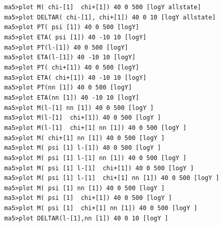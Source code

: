 \documentclass[a4paper, 10pt]{article}
\begin{document}
\texttt{ }\texttt{ }\texttt{ma5>plot M(~chi-[1] ~chi+[1]) 40 0  500 [logY allstate]\\
}
\texttt{ }\texttt{ }\texttt{ma5>plot DELTAR(~chi-[1],~chi+[1]) 40 0 10 [logY allstate]\\
}
\texttt{ }\texttt{ }\texttt{ma5>plot  PT(~psi~[1]) 40 0  500 [logY]\\
}
\texttt{ }\texttt{ }\texttt{ma5>plot ETA(~psi~[1]) 40 -10 10 [logY]\\
}
\texttt{ }\texttt{ }\texttt{ma5>plot  PT(l-[1]) 40 0  500 [logY]\\
}
\texttt{ }\texttt{ }\texttt{ma5>plot ETA(l-[1]) 40 -10 10 [logY]\\
}
\texttt{ }\texttt{ }\texttt{ma5>plot  PT(~chi+[1]) 40 0  500 [logY]\\
}
\texttt{ }\texttt{ }\texttt{ma5>plot ETA(~chi+[1]) 40 -10 10 [logY]\\
}
\texttt{ }\texttt{ }\texttt{ma5>plot  PT(nn~[1]) 40 0  500 [logY]\\
}
\texttt{ }\texttt{ }\texttt{ma5>plot ETA(nn~[1]) 40 -10 10 [logY]\\
}
\texttt{ }\texttt{ }\texttt{ma5>plot M(l-[1] nn~[1]) 40 0  500 [logY ]\\
}
\texttt{ }\texttt{ }\texttt{ma5>plot M(l-[1] ~chi+[1]) 40 0  500 [logY ]\\
}
\texttt{ }\texttt{ }\texttt{ma5>plot M(l-[1] ~chi+[1] nn~[1]) 40 0  500 [logY ]\\
}
\texttt{ }\texttt{ }\texttt{ma5>plot M(~chi+[1] nn~[1]) 40 0  500 [logY ]\\
}
\texttt{ }\texttt{ }\texttt{ma5>plot M(~psi~[1] l-[1]) 40 0  500 [logY ]\\
}
\texttt{ }\texttt{ }\texttt{ma5>plot M(~psi~[1] l-[1] nn~[1]) 40 0  500 [logY ]\\
}
\texttt{ }\texttt{ }\texttt{ma5>plot M(~psi~[1] l-[1] ~chi+[1]) 40 0  500 [logY ]\\
}
\texttt{ }\texttt{ }\texttt{ma5>plot M(~psi~[1] l-[1] ~chi+[1] nn~[1]) 40 0  500 [logY ]\\
}
\texttt{ }\texttt{ }\texttt{ma5>plot M(~psi~[1] nn~[1]) 40 0  500 [logY ]\\
}
\texttt{ }\texttt{ }\texttt{ma5>plot M(~psi~[1] ~chi+[1]) 40 0  500 [logY ]\\
}
\texttt{ }\texttt{ }\texttt{ma5>plot M(~psi~[1] ~chi+[1] nn~[1]) 40 0  500 [logY ]\\
}
\texttt{ }\texttt{ }\texttt{ma5>plot DELTAR(l-[1],nn~[1]) 40 0 10 [logY ]\\
}
\end{document}
